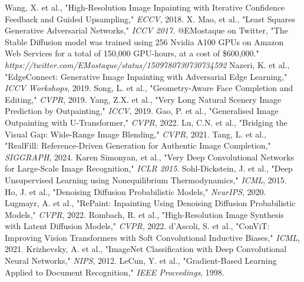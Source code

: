 \documentclass[sigconf]{acmart}
\begin{document}
\begin{thebibliography}{99}
     Wang, X. et al., "High-Resolution Image Inpainting with Iterative Confidence Feedback and Guided Upsampling," \textit{ECCV}, 2018.
     X. Mao, et al., "Least Squares Generative Adversarial Networks," \textit{ICCV 2017}.
     @EMostaque on Twitter, "The Stable Diffusion model was trained using 256 Nvidia A100 GPUs on Amazon Web Services for a total of 150,000 GPU-hours, at a cost of \$600,000." \textit{https://twitter.com/EMostaque/status/1509780730730734592}
     Nazeri, K. et al., "EdgeConnect: Generative Image Inpainting with Adversarial Edge Learning," \textit{ICCV Workshops}, 2019.
     Song, L. et al., "Geometry-Aware Face Completion and Editing," \textit{CVPR}, 2019.
     Yang, Z.X. et al., "Very Long Natural Scenery Image Prediction by Outpainting," \textit{ICCV}, 2019.
     Gao, P. et al., "Generalised Image Outpainting with U-Transformer," \textit{CVPR}, 2022.
     Lu, C.N. et al., "Bridging the Visual Gap: Wide-Range Image Blending," \textit{CVPR}, 2021.
     Tang, L. et al., "RealFill: Reference-Driven Generation for Authentic Image Completion," \textit{SIGGRAPH}, 2024.
     Karen Simonyan, et al., "Very Deep Convolutional Networks for Large-Scale Image Recognition," \textit{ICLR 2015}.
     Sohl-Dickstein, J. et al., "Deep Unsupervised Learning using Nonequilibrium Thermodynamics," \textit{ICML}, 2015.
     Ho, J. et al., "Denoising Diffusion Probabilistic Models," \textit{NeurIPS}, 2020.
     Lugmayr, A. et al., "RePaint: Inpainting Using Denoising Diffusion Probabilistic Models," \textit{CVPR}, 2022.
     Rombach, R. et al., "High-Resolution Image Synthesis with Latent Diffusion Models," \textit{CVPR}, 2022.
     d’Ascoli, S. et al., "ConViT: Improving Vision Transformers with Soft Convolutional Inductive Biases," \textit{ICML}, 2021.
     Krizhevsky, A. et al., "ImageNet Classification with Deep Convolutional Neural Networks," \textit{NIPS}, 2012.
     LeCun, Y. et al., "Gradient-Based Learning Applied to Document Recognition," \textit{IEEE Proceedings}, 1998.
\end{thebibliography}
\end{document}

